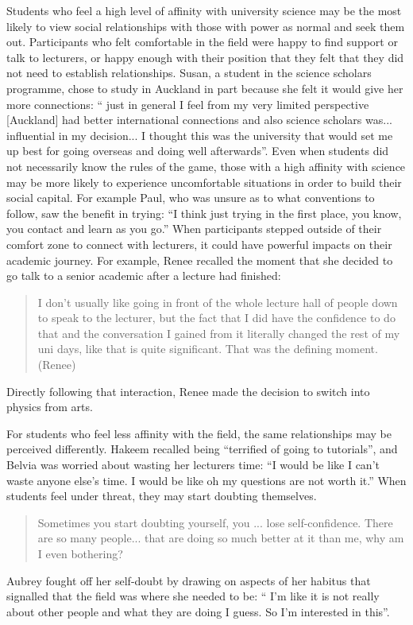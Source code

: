 Students who feel a high level of affinity with university science may be the most likely to view social relationships with those with power as normal and seek them out. Participants who felt comfortable in the field were happy to find support or talk to lecturers, or happy enough with their position that they felt that they did not need to establish relationships. Susan, a student in the science scholars programme, chose to study in Auckland in part because she felt it would give her more connections: `` just in general I feel from my very limited perspective [Auckland] had better international connections and also science scholars was... influential in my decision... I thought this was the university that would set me up best for going overseas and doing well afterwards''. Even when students did not necessarily know the rules of the game, those with a high affinity with science may be more likely to experience uncomfortable situations in order to build their social capital. For example Paul, who was unsure as to what conventions to follow, saw the benefit in trying: ``I think just trying in the first place, you know, you contact and learn as you go.'' When participants stepped outside of their comfort zone to connect with lecturers, it could have powerful impacts on their academic journey. For example, Renee recalled the moment that she decided to go talk to a senior academic after a lecture had finished: \blockquote{I don't usually like going in front of the whole lecture hall of people down to speak to the lecturer, but the fact that I did have the confidence to do that and the conversation I gained from it literally changed the rest of my uni days, like that is quite significant. That was the defining moment. (Renee)}  Directly following that interaction, Renee made the decision to switch into physics from arts.


For students who feel less affinity with the field, the same relationships may be perceived differently. Hakeem recalled being ``terrified of going to tutorials'', and Belvia was worried about wasting her lecturers time: ``I would be like I can’t waste anyone else’s time. I would be like oh my questions are not worth it.'' When students feel under threat, they may start doubting themselves. \blockquote{Sometimes you start doubting yourself, you ... lose self-confidence. There are so many people... that are doing so much better at it than me, why am I even bothering?} Aubrey fought off her self-doubt by drawing on aspects of her habitus that signalled that the field was where she needed to be: `` I'm like it is not really about other people and what they are doing I guess. So I’m interested in this''.


